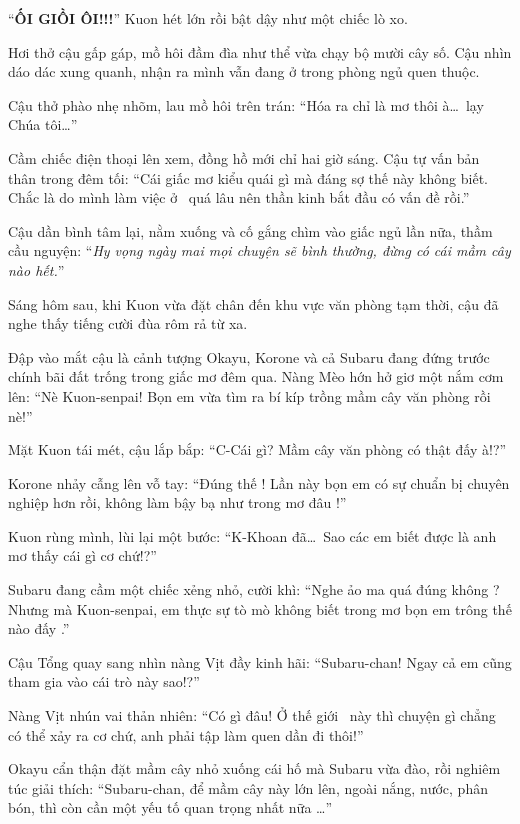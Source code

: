 \documentclass[../main.tex]{subfiles}
\begin{document}
\omk

``\textbf{ỐI GIỒI ÔI!!!}'' Kuon hét lớn rồi bật dậy như một chiếc lò xo.

Hơi thở cậu gấp gáp, mồ hôi đầm đìa như thể vừa chạy bộ mười cây số. Cậu nhìn dáo dác xung quanh, nhận ra mình vẫn đang ở trong phòng ngủ quen thuộc.

Cậu thở phào nhẹ nhõm, lau mồ hôi trên trán: ``Hóa ra chỉ là mơ thôi à\dots\ lạy Chúa tôi\dots''

Cầm chiếc điện thoại lên xem, đồng hồ mới chỉ hai giờ sáng. Cậu tự vấn bản thân trong đêm tối: ``Cái giấc mơ kiểu quái gì mà đáng sợ thế này không biết. Chắc là do mình làm việc ở \hll\ quá lâu nên thần kinh bắt đầu có vấn đề rồi.''

Cậu dần bình tâm lại, nằm xuống và cố gắng chìm vào giấc ngủ lần nữa, thầm cầu nguyện: ``\textit{Hy vọng ngày mai mọi chuyện sẽ bình thường, đừng có cái mầm cây nào hết.}''

\ct

Sáng hôm sau, khi Kuon vừa đặt chân đến khu vực văn phòng tạm thời, cậu đã nghe thấy tiếng cười đùa rôm rả từ xa.

Đập vào mắt cậu là cảnh tượng Okayu, Korone và cả Subaru đang đứng trước chính bãi đất trống trong giấc mơ đêm qua. Nàng Mèo hớn hở giơ một nắm cơm lên: ``Nè Kuon-senpai! Bọn em vừa tìm ra bí kíp trồng mầm cây văn phòng rồi nè!''

Mặt Kuon tái mét, cậu lắp bắp: ``C-Cái gì? Mầm cây văn phòng có thật đấy à!?''

Korone nhảy cẫng lên vỗ tay: ``Đúng thế ! Lần này bọn em có sự chuẩn bị chuyên nghiệp hơn rồi, không làm bậy bạ như trong mơ đâu !''

Kuon rùng mình, lùi lại một bước: ``K-Khoan đã\dots\ Sao các em biết được là anh mơ thấy cái gì cơ chứ!?''

Subaru đang cầm một chiếc xẻng nhỏ, cười khì: ``Nghe ảo ma quá đúng không ? Nhưng mà Kuon-senpai, em thực sự tò mò không biết trong mơ bọn em trông thế nào đấy .''

Cậu Tổng quay sang nhìn nàng Vịt đầy kinh hãi: ``Subaru-chan! Ngay cả em cũng tham gia vào cái trò này sao!?''

Nàng Vịt nhún vai thản nhiên: ``Có gì đâu! Ở thế giới \hll\ này thì chuyện gì chẳng có thể xảy ra cơ chứ, anh phải tập làm quen dần đi thôi!''

Okayu cẩn thận đặt mầm cây nhỏ xuống cái hố mà Subaru vừa đào, rồi nghiêm túc giải thích: ``Subaru-chan, để mầm cây này lớn lên, ngoài nắng, nước, phân bón, thì còn cần một yếu tố quan trọng nhất nữa \dots''
\end{document}
